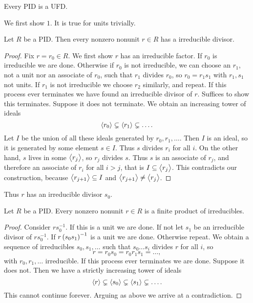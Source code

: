 \begin{theorem}
\label{thm:3.3.2}
Every PID is a UFD.
\end{theorem}

We first show $ 1 $. It is true for units trivially.

\begin{lemma}
Let $ R $ be a PID. Then every nonzero nonunit $ r \in R $ has a irreducible divisor.
\end{lemma}

\begin{proof}
Fix $ r = r_0 \in R $. We first show $ r $ has an irreducible factor. If $ r_0 $ is irreducible we are done. Otherwise if $ r_0 $ is not irreducible, we can choose an $ r_1 $, not a unit nor an associate of $ r_0 $, such that $ r_1 $ divides $ r_0 $, so $ r_0 = r_1s_1 $ with $ r_1, s_1 $ not units. If $ r_1 $ is not irreducible we choose $ r_2 $ similarly, and repeat. If this process ever terminates we have found an irreducible divisor of $ r $. Suffices to show this terminates. Suppose it does not terminate. We obtain an increasing tower of ideals
$$ \left\langle r_0 \right\rangle \subsetneq \left\langle r_1 \right\rangle \subsetneq \dots. $$
Let $ I $ be the union of all these ideals generated by $ r_0, r_1, \dots $. Then $ I $ is an ideal, so it is generated by some element $ s \in I $. Thus $ s $ divides $ r_i $ for all $ i $. On the other hand, $ s $ lives in some $ \left\langle r_j \right\rangle $, so $ r_j $ divides $ s $. Thus $ s $ is an associate of $ r_j $, and therefore an associate of $ r_i $ for all $ i > j $, that is $ I \subseteq \left\langle r_j \right\rangle $. This contradicts our construction, because $ \left\langle r_{j + 1} \right\rangle \subseteq I $ and $ \left\langle r_{j + 1} \right\rangle \ne \left\langle r_j \right\rangle $.
\end{proof}

Thus $ r $ has an irreducible divisor $ s_0 $.

\pagebreak

\begin{lemma}
Let $ R $ be a PID. Every nonzero nonunit $ r \in R $ is a finite product of irreducibles.
\end{lemma}

\begin{proof}
Consider $ rs_0^{-1} $. If this is a unit we are done. If not let $ s_1 $ be an irreducible divisor of $ rs_0^{-1} $. If $ r\br{s_0s_1}^{-1} $ is a unit we are done. Otherwise repeat. We obtain a sequence of irreducibles $ s_0, s_1, \dots $ such that $ s_0 \dots s_i $ divides $ r $ for all $ i $, so
$$ r = r_0s_0 = r_0r_1s_1 = \dots, $$
with $ r_0, r_1, \dots $ irreducible. If this process ever terminates we are done. Suppose it does not. Then we have a strictly increasing tower of ideals
$$ \left\langle r \right\rangle \subsetneq \left\langle s_0 \right\rangle \subsetneq \left\langle s_1 \right\rangle \subsetneq \dots. $$
This cannot continue forever. Arguing as above we arrive at a contradiction.
\end{proof}

